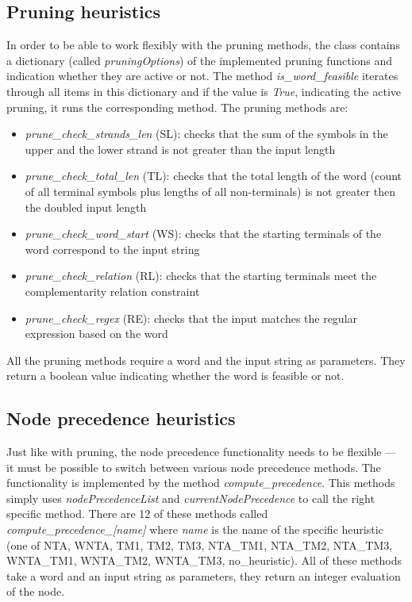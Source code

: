 \subsection{Pruning heuristics}
In order to be able to work flexibly with the pruning methods, the class contains a dictionary (called \textit{pruningOptions}) of the implemented pruning functions and indication whether they are active or not. The method \textit{is\_word\_feasible} iterates through all items in this dictionary and if the value is \textit{True}, indicating the active pruning, it runs the corresponding method.
The pruning methods are:
\begin{itemize}
  \item{\textit{prune\_check\_strands\_len} (SL): checks that the sum of the symbols in the upper and the lower strand is not greater than the input length}

  \item{\textit{prune\_check\_total\_len} (TL): checks that the total length of the word (count of all terminal symbols plus lengths of all non-terminals) is not greater then the doubled input length}

  \item{\textit{prune\_check\_word\_start} (WS): checks that the starting terminals of the word correspond to the input string}

  \item{\textit{prune\_check\_relation} (RL): checks that the starting terminals meet the complementarity relation constraint}

  \item{\textit{prune\_check\_regex} (RE): checks that the input matches the regular expression based on the word}
\end{itemize}

All the pruning methods require a word and the input string as parameters. They return a boolean value indicating whether the word is feasible or not.

\subsection{Node precedence heuristics}
Just like with pruning, the node precedence functionality needs to be flexible --- it must be possible to switch between various node precedence methods. The functionality is implemented by the method \textit{compute\_precedence}. This methods simply uses \textit{nodePrecedenceList} and \textit{currentNodePrecedence} to call the right specific method.
There are 12 of these methods called \textit{compute\_precedence\_[name]} where \textit{name} is the name of the specific heuristic (one of NTA, WNTA, TM1, TM2, TM3, NTA\_TM1, NTA\_TM2, NTA\_TM3, WNTA\_TM1, WNTA\_TM2, WNTA\_TM3, no\_heuristic). All of these methods take a word and an input string as parameters, they return an integer evaluation of the node.

